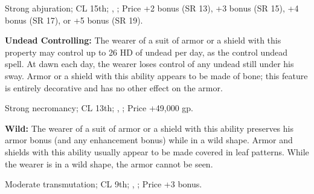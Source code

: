 Strong abjuration; CL 15th; , ; Price +2 bonus (SR 13), +3 bonus (SR 15), +4 bonus (SR 17), or +5 bonus (SR 19).

\textbf{Undead Controlling:} The wearer of a suit of armor or a shield with this property may control up to 26 HD of undead per day, as the control undead spell. At dawn each day, the wearer loses control of any undead still under his sway. Armor or a shield with this ability appears to be made of bone; this feature is entirely decorative and has no other effect on the armor.

Strong necromancy; CL 13th; , ; Price +49,000 gp.

\textbf{Wild:} The wearer of a suit of armor or a shield with this ability preserves his armor bonus (and any enhancement bonus) while in a wild shape. Armor and shields with this ability usually appear to be made covered in leaf patterns. While the wearer is in a wild shape, the armor cannot be seen.

Moderate transmutation; CL 9th; , ; Price +3 bonus. 
